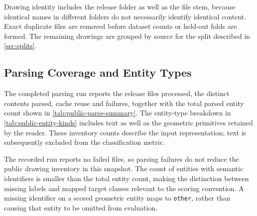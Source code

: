 Drawing identity includes the release folder as well as the file stem, because
identical names in different folders do not necessarily identify identical content.
Exact duplicate files are removed before dataset counts or held-out folds are
formed.
The remaining drawings are grouped by source for the split described in
\cref{sec:splits}.

\subsection{Parsing Coverage and Entity Types}
\label{sec:public-parsing}
The completed parsing run reports the release files processed, the distinct
contents parsed, cache reuse and failures, together with the total parsed entity
count shown in \cref{tab:public-parse-summary}.
The entity-type breakdown in \cref{tab:public-entity-kinds} includes text as well
as the geometric primitives retained by the reader.
These inventory counts describe the input representation; text is subsequently
excluded from the classification metric.

\begin{table}[htbp]
  \centering
  \caption{Public-release parsing summary, computed over distinct content where
  indicated. Cache-served files and distinct contents are separate reported
  quantities.}
  \label{tab:public-parse-summary}
  
\end{table}

\begin{table}[htbp]
  \centering
  \caption{Parsed entities by geometric kind, with text reported separately.
  Counts refer to distinct contents in the parsing run.}
  \label{tab:public-entity-kinds}
  
\end{table}

The recorded run reports no failed files, so parsing failures do not reduce the
public drawing inventory in this snapshot.
The count of entities with semantic identifiers is smaller than the total entity
count, making the distinction between missing labels and mapped target classes
relevant to the scoring convention.
A missing identifier on a scored geometric entity maps to \texttt{other}, rather
than causing that entity to be omitted from evaluation.

